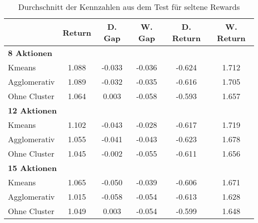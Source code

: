 \begin{table}[ht]
\centering
\caption{Durchschnitt der Kennzahlen aus dem Test für seltene Rewards}
\begin{tabular}{lccccc}
\hline
\textbf{} & \textbf{Return} & \textbf{D. Gap} & \textbf{W. Gap} & \textbf{D. Return} & \textbf{W. Return} \\
\hline
\multicolumn{6}{l}{\textbf{8 Aktionen}} \\
\hspace{1em}Kmeans & 1.088 & -0.033 & -0.036 & -0.624 & 1.712 \\
\hspace{1em}Agglomerativ & 1.089 & -0.032 & -0.035 & -0.616 & 1.705 \\
\hspace{1em}Ohne Cluster & 1.064 & 0.003 & -0.058 & -0.593 & 1.657 \\
\hline
\multicolumn{6}{l}{\textbf{12 Aktionen}} \\
\hspace{1em}Kmeans & 1.102 & -0.043 & -0.028 & -0.617 & 1.719 \\
\hspace{1em}Agglomerativ & 1.055 & -0.041 & -0.043 & -0.623 & 1.678 \\
\hspace{1em}Ohne Cluster & 1.045 & -0.002 & -0.055 & -0.611 & 1.656 \\
\hline
\multicolumn{6}{l}{\textbf{15 Aktionen}} \\
\hspace{1em}Kmeans & 1.065 & -0.050 & -0.039 & -0.606 & 1.671 \\
\hspace{1em}Agglomerativ & 1.015 & -0.058 & -0.054 & -0.613 & 1.628 \\
\hspace{1em}Ohne Cluster & 1.049 & 0.003 & -0.054 & -0.599 & 1.648 \\
\hline
\end{tabular}
\end{table}
